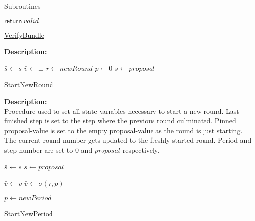 \documentclass[10pt,a4paper]{article}
\begin{document}
\begin{section}{Subroutines}
\begin{algorithm}[H]
\begin{algorithmic}[1]
    \State $\mathsf{return} \ valid$

    \EndFunction
    \end{algorithmic}
    \caption{\underline{VerifyBundle}}
\end{algorithm}

\noindent \textbf{Description:}\\



\begin{algorithm}[H]
    \begin{algorithmic}[1]

    \State $\bar{s} \gets s$
    \State $\bar{v} \gets \bot$
    \State $r \gets newRound$
    \State $p \gets 0$
    \State $s \gets proposal$

    \EndFunction
    \end{algorithmic}
    \caption{\underline{StartNewRound}}
\end{algorithm}

\noindent \textbf{Description:}\\
Procedure used to set all state variables necessary to start a new round.
Last finished step is set to the step where the previous round culminated.
Pinned proposal-value is set to the empty proposal-value as the round is just starting.
The current round number gets updated to the freshly started round.
Period and step number are set to $0$ and $proposal$ respectively.


\begin{algorithm}[H]
    \begin{algorithmic}[1]

    \State $\bar{s} \gets s$
    \State $s \gets proposal$

        \State $\bar{v} \gets v$
        \State $\bar{v} \gets \sigma(r,p)$
    \EndIf

    \State $p \gets newPeriod$

    \EndFunction
    \end{algorithmic}
    \caption{\underline{StartNewPeriod}}
\end{algorithm}


\end{section}
\end{document}
